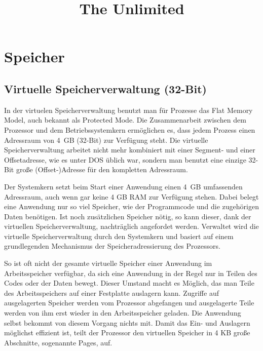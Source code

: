 \documentclass[12pt]{book}
\begin{document}
\title{The Unlimited}
\maketitle

\chapter{Speicher}

\section{Virtuelle Speicherverwaltung (32-Bit)}

In der virtuelen Speicherverwaltung benutzt man für Prozesse das Flat Memory
Model, auch bekannt als Protected Mode. Die Zusammenarbeit zwischen dem
Prozessor und dem Betriebssystemkern ermöglichen es, dass jedem Prozess einen
Adressraum von 4 GB (32-Bit) zur Verfügung steht. Die virtuelle Speicherverwaltung
arbeitet nicht mehr kombiniert mit einer Segment- und einer Offsetadresse, wie
es unter DOS üblich war, sondern man benutzt eine einzige 32-Bit große
(Offset-)Adresse für den kompletten Adressraum.

Der Systemkern setzt beim Start einer Anwendung einen 4 GB umfassenden
Adressraum, auch wenn gar keine 4 GB RAM zur Verfügung stehen. Dabei belegt
eine Anwendung nur so viel Speicher, wie der Programmcode und die zugehörigen
Daten benötigen. Ist noch zusätzlichen Speicher nötig, so kann
dieser, dank der virtuellen Speicherverwaltung, nachträglich angefordet werden.
Verwaltet wird die virtuelle Speicherverwaltung durch den Systemkern und basiert
auf einem grundlegenden Mechanismus der Speicheradressierung des Prozessors.

So ist oft nicht der gesamte virtuelle Speicher einer Anwendung im
Arbeitsspeicher verfügbar, da sich eine Anwendung in der Regel nur in Teilen des
Codes oder der Daten bewegt. Dieser Umstand macht es Möglich, das man Teile des
Arbeitsspeichers auf einer Festplatte auslagern kann. Zugriffe auf ausgelagerten
Speicher werden vom Prozessor abgefangen und ausgelagerte Teile werden von ihm
erst wieder in den Arbeitsspeicher geladen. Die Anwendung selbst bekommt von
diesem Vorgang nichts mit. Damit das Ein- und Auslagern möglichst effizient ist,
teilt der Prozessor den virtuellen Speicher in 4 KB große Abschnitte, sogenannte
Pages, auf.
\end{document}
